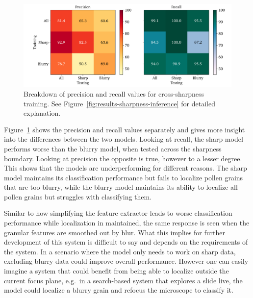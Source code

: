 \begin{figure}[htbp]
  \centering
  \includegraphics[width=\textwidth]{figs/results/sharpness/confustion_balanced_test_dual.pdf}
  \caption[Precision \& Recall across sharpness boundary]{%
Breakdown of precision and recall values for cross-sharpness training. See Figure~\ref{fig:results-sharpness-inference} for detailed explanation.
  }\label{fig:results-sharpness-pr-rec}
\end{figure}

Figure~\ref{fig:results-sharpness-pr-rec} shows the precision and recall values separately and gives more insight into the differences between the two models.
Looking at recall, the sharp model performs worse than the blurry model, when tested across the sharpness boundary.
Looking at precision the opposite is true, however to a lesser degree.
This shows that the models are underperforming for different reasons.
The sharp model maintains its classification performance but fails to localize pollen grains that are too blurry, while the blurry model maintains its ability to localize all pollen grains but struggles with classifying them.

Similar to how simplifying the feature extractor leads to worse classification performance while localization in maintained, the same response is seen when the granular features are smoothed out by blur.
What this implies for further development of this system is difficult to say and depends on the requirements of the system.
In a scenario where the model only needs to work on sharp data, excluding blurry data could improve overall performance.
However one can easily imagine a system that could benefit from being able to localize outside the current focus plane, e.g.\ in a  search-based system that explores a slide live, the model could localize a blurry grain and refocus the microscope to classify it.

